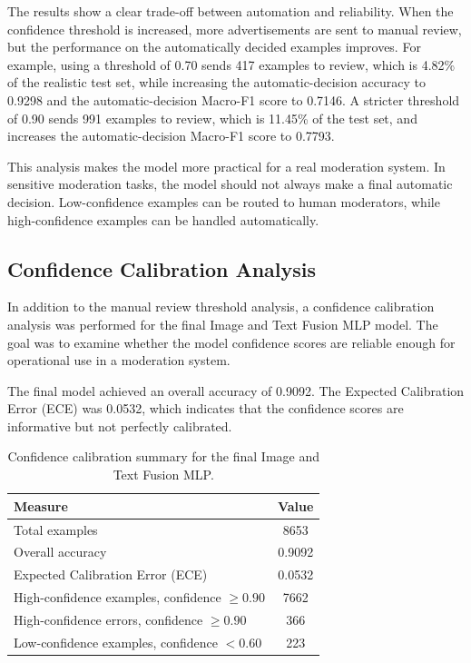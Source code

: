 \documentclass[12pt]{article}
\begin{document}
The results show a clear trade-off between automation and reliability. When the confidence threshold is increased, more advertisements are sent to manual review, but the performance on the automatically decided examples improves. For example, using a threshold of 0.70 sends 417 examples to review, which is 4.82\% of the realistic test set, while increasing the automatic-decision accuracy to 0.9298 and the automatic-decision Macro-F1 score to 0.7146. A stricter threshold of 0.90 sends 991 examples to review, which is 11.45\% of the test set, and increases the automatic-decision Macro-F1 score to 0.7793.

This analysis makes the model more practical for a real moderation system. In sensitive moderation tasks, the model should not always make a final automatic decision. Low-confidence examples can be routed to human moderators, while high-confidence examples can be handled automatically.

\subsection{Confidence Calibration Analysis}

In addition to the manual review threshold analysis, a confidence calibration analysis was performed for the final Image and Text Fusion MLP model. The goal was to examine whether the model confidence scores are reliable enough for operational use in a moderation system.

The final model achieved an overall accuracy of 0.9092. The Expected Calibration Error (ECE) was 0.0532, which indicates that the confidence scores are informative but not perfectly calibrated.

\begin{table}[H]
\centering
\begin{tabular}{lc}
\toprule
\textbf{Measure} & \textbf{Value} \\
\midrule
Total examples & 8653 \\
Overall accuracy & 0.9092 \\
Expected Calibration Error (ECE) & 0.0532 \\
High-confidence examples, confidence $\geq 0.90$ & 7662 \\
High-confidence errors, confidence $\geq 0.90$ & 366 \\
Low-confidence examples, confidence $< 0.60$ & 223 \\
\bottomrule
\end{tabular}
\caption{Confidence calibration summary for the final Image and Text Fusion MLP.}
\label{tab:confidence_calibration}
\end{table}
\end{document}
